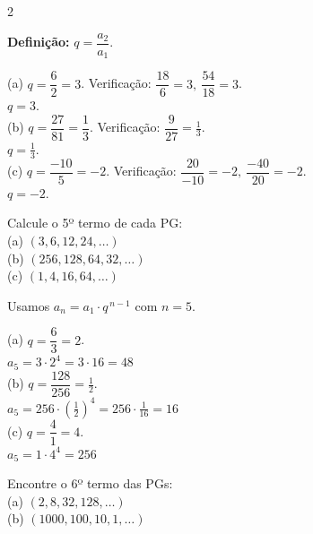 \documentclass[11pt]{article}
\begin{document}
\begin{multicols}{2}
\begin{enumerate}[leftmargin=*]
\begin{tcolorbox}[colback=green!10,colframe=green!60!black,title=\textbf{Solução da questão 1 },text width=0.85\columnwidth]
\textbf{Definição:} $q=\dfrac{a_2}{a_1}$.

(a) $q=\dfrac{6}{2}=3$. Verificação: $\dfrac{18}{6}=3,\ \dfrac{54}{18}=3$. \\
\(\boxed{q=3}\). \\

(b) $q=\dfrac{27}{81}=\dfrac{1}{3}$. Verificação: $\dfrac{9}{27}=\tfrac{1}{3}$. \\
\(\boxed{q=\tfrac{1}{3}}\). \\

(c) $q=\dfrac{-10}{5}=-2$. Verificação: $\dfrac{20}{-10}=-2,\ \dfrac{-40}{20}=-2$. \\
\(\boxed{q=-2}\).
\end{tcolorbox}

\begin{tcolorbox}[colback=blue!8,colframe=blue!60!black,title=\textbf{Questão 2 },text width=0.85\columnwidth]
Calcule o 5º termo de cada PG: \\
(a) $(3,6,12,24,\ldots)$ \\ (b) $(256,128,64,32,\ldots)$ \\ (c) $(1,4,16,64,\ldots)$
\end{tcolorbox}

\begin{tcolorbox}[colback=green!10,colframe=green!60!black,title=\textbf{Solução da questão 2 },text width=0.85\columnwidth]
Usamos $a_n=a_1\cdot q^{\,n-1}$ com $n=5$.

(a) $q=\dfrac{6}{3}=2$. \\
$a_5 = 3\cdot 2^{4} = 3\cdot16 = \boxed{48}$ \\

(b) $q=\dfrac{128}{256}=\tfrac{1}{2}$. \\
$a_5 = 256\cdot\left(\tfrac{1}{2}\right)^{4} = 256\cdot\tfrac{1}{16} = \boxed{16}$ \\

(c) $q=\dfrac{4}{1}=4$. \\
$a_5 = 1\cdot 4^{4} = \boxed{256}$
\end{tcolorbox}

\begin{tcolorbox}[colback=blue!8,colframe=blue!60!black,title=\textbf{Questão 3 },text width=0.85\columnwidth]
Encontre o 6º termo das PGs: \\
(a) $(2,8,32,128,\ldots)$ \\ (b) $(1000,100,10,1,\ldots)$
\end{tcolorbox}


\end{enumerate}
\end{multicols}
\end{document}

